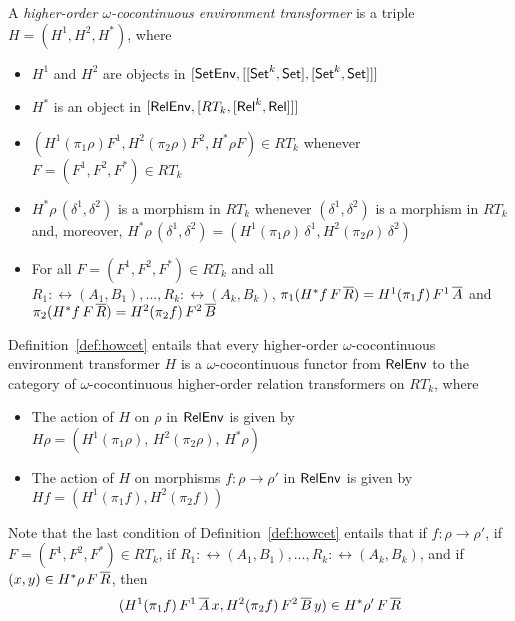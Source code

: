 \documentclass{lmcs}
\theoremstyle{plain}\newtheorem{satz}[thm]{Satz}
\newcommand{\set}{\mathsf{Set}}
\begin{document}
{\begin{defi}\label{def:howcet}
A {\em higher-order $\omega$-cocontinuous environment transformer}
is a triple $H = (H^1,H^2,H^*)$, where
\begin{itemize}
\item $H^1$ and $H^2$ are objects in
  $[\setenv,[[\set^k,\set],[\set^k,\set]]]$ 
\item $H^*$ is an object in $[\mathsf{RelEnv},[RT_k,[\mathsf{Rel}^k,\mathsf{Rel}]]]$
\item $(H^1(\pi_1 \rho) F^1,H^2(\pi_2 \rho) F^2, H^* \rho F) \in
  RT_k$ whenever $F = (F^1,F^2,F^*) \in RT_k$
\item $H^*\rho\, (\delta^1, \delta^2)$ is a morphism in $RT_k$
  whenever $(\delta^1, \delta^2)$ is a morphism in $RT_k$ and,
  moreover, $H^*\rho\, (\delta^1, \delta^2) = (H^1(\pi_1
  \rho)\,\delta^1, H^2(\pi_2 \rho)\, \delta^2)$
\item For all $F = (F^1,F^2,F^*) \in RT_k$ and all $R_1 :
  \rel(A_1,B_1),...,R_k : \rel(A_k,B_k)$, $\pi_1(H^* f \,F\,\overline{R}) =
  H^1 (\pi_1 f)\,F^1\,\overline{A}$ and $\pi_2(H^*f \,F\,\overline{R}) = H^2
  (\pi_2 f)\,F^2\,\overline{B}$
\end{itemize}
\end{defi}
\noindent
Definition~\ref{def:howcet} entails that every higher-order
$\omega$-cocontinuous environment transformer $H$ is a
$\omega$-cocontinuous functor from $\mathsf{RelEnv}$ to
the category of $\omega$-cocontinuous higher-order
relation transformers on $RT_k$, where
\begin{itemize}
\item The action of $H$ on $\rho$ in $\mathsf{RelEnv}$ is given by $H \rho = (H^1
  (\pi_1 \rho),\,H^2 (\pi_2 \rho),\,H^*\rho)$
\item The action of $H$ on morphisms $f : \rho \to \rho'$ in $\mathsf{RelEnv}$
  is given by $Hf = (H^1 (\pi_1 f),H^2 (\pi_2 f))$
\end{itemize}
\noindent
Note that the last condition of Definition~\ref{def:howcet} entails
that if $f : \rho \to \rho'$, if $F = (F^1,F^2,F^*) \in RT_k$, if $R_1 :
\rel(A_1,B_1),...,R_k : \rel(A_k,B_k)$, and if $(x, y) \in
H^*\rho\,F\,\overline{R}$, then \[(H^1(\pi_1 f)\,F^1\,\overline{A}\,x, H^2(\pi_2
f)\,F^2\,\overline{B}\,y) \in H^*\rho'\,F\,\overline{R}\]

}
\end{document}
